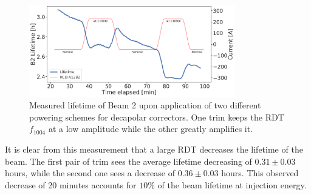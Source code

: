 \begin{figure}[!htb]
    \centering
    \includegraphics[width=0.8\textwidth]{./images/b5_lifetime.pdf}
    \caption{Measured lifetime of Beam 2 upon application of two different powering schemes for
    decapolar correctors. One trim keeps the RDT $f_{1004}$ at a low amplitude while the other greatly
    amplifies it.}
    \label{fig:decapoles:impact:b5_lifetime}
\end{figure}

It is clear from this measurement that a large RDT decreases the lifetime of the beam.
The first pair of trim sees the average lifetime decreasing of $0.31 \pm 0.03$ hours, while the
second one sees a decrease of $0.36 \pm 0.03$ hours. This observed decrease of 20 minutes accounts
for $10\%$ of the beam lifetime at injection energy.

